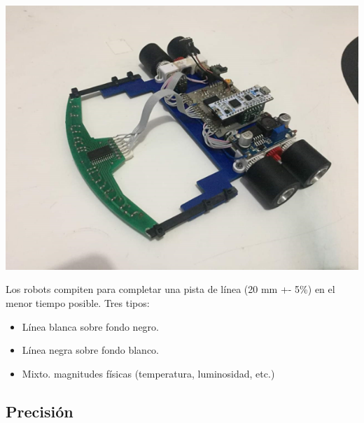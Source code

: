 \documentclass[a4paper,11pt]{report}    %
\begin{document}
\begin{minipage}{0.4\textwidth}
    
        \includegraphics[width=\linewidth]{img/image2.png}
\end{minipage}
\hfill
\begin{minipage}{0.5\textwidth}
    Los robots compiten para completar una pista de línea (20 mm +- 5\%) en el menor tiempo posible.
Tres tipos:

\begin{itemize}
    \item Línea blanca sobre fondo negro.
	\item Línea negra sobre fondo blanco.
	\item Mixto. magnitudes físicas (temperatura, luminosidad, etc.)
\end{itemize}
\end{minipage}


\subsection{Precisión}
\end{document}
